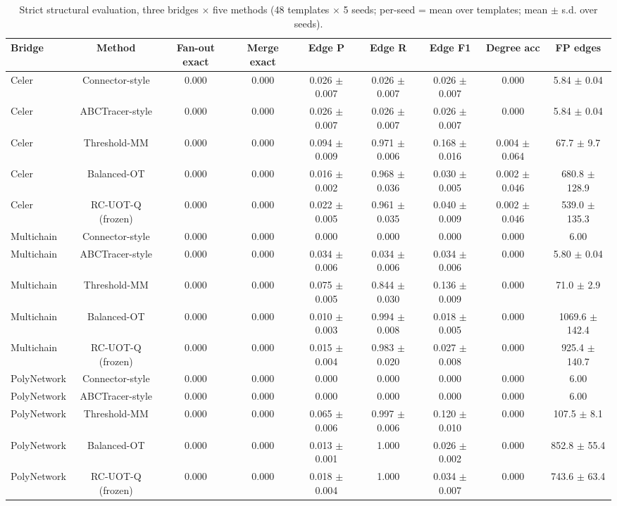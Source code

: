 \begin{table}[!t]
\caption{Strict structural evaluation, three bridges $\times$ five methods (48 templates $\times$ 5 seeds; per-seed = mean over templates; mean $\pm$ s.d. over seeds).}
\label{tab:strict}
\centering
\footnotesize
\setlength{\tabcolsep}{4pt}
\begin{tabular}{lcccccccc}
\toprule
Bridge & Method & Fan-out exact & Merge exact & Edge P & Edge R & Edge F1 & Degree acc & FP edges \\
\midrule
Celer & Connector-style & 0.000 & 0.000 & 0.026 $\pm$ 0.007 & 0.026 $\pm$ 0.007 & 0.026 $\pm$ 0.007 & 0.000 & 5.84 $\pm$ 0.04 \\
Celer & ABCTracer-style & 0.000 & 0.000 & 0.026 $\pm$ 0.007 & 0.026 $\pm$ 0.007 & 0.026 $\pm$ 0.007 & 0.000 & 5.84 $\pm$ 0.04 \\
Celer & Threshold-MM & 0.000 & 0.000 & 0.094 $\pm$ 0.009 & 0.971 $\pm$ 0.006 & 0.168 $\pm$ 0.016 & 0.004 $\pm$ 0.064 & 67.7 $\pm$ 9.7 \\
Celer & Balanced-OT & 0.000 & 0.000 & 0.016 $\pm$ 0.002 & 0.968 $\pm$ 0.036 & 0.030 $\pm$ 0.005 & 0.002 $\pm$ 0.046 & 680.8 $\pm$ 128.9 \\
Celer & RC-UOT-Q (frozen) & 0.000 & 0.000 & 0.022 $\pm$ 0.005 & 0.961 $\pm$ 0.035 & 0.040 $\pm$ 0.009 & 0.002 $\pm$ 0.046 & 539.0 $\pm$ 135.3 \\
Multichain & Connector-style & 0.000 & 0.000 & 0.000 & 0.000 & 0.000 & 0.000 & 6.00 \\
Multichain & ABCTracer-style & 0.000 & 0.000 & 0.034 $\pm$ 0.006 & 0.034 $\pm$ 0.006 & 0.034 $\pm$ 0.006 & 0.000 & 5.80 $\pm$ 0.04 \\
Multichain & Threshold-MM & 0.000 & 0.000 & 0.075 $\pm$ 0.005 & 0.844 $\pm$ 0.030 & 0.136 $\pm$ 0.009 & 0.000 & 71.0 $\pm$ 2.9 \\
Multichain & Balanced-OT & 0.000 & 0.000 & 0.010 $\pm$ 0.003 & 0.994 $\pm$ 0.008 & 0.018 $\pm$ 0.005 & 0.000 & 1069.6 $\pm$ 142.4 \\
Multichain & RC-UOT-Q (frozen) & 0.000 & 0.000 & 0.015 $\pm$ 0.004 & 0.983 $\pm$ 0.020 & 0.027 $\pm$ 0.008 & 0.000 & 925.4 $\pm$ 140.7 \\
PolyNetwork & Connector-style & 0.000 & 0.000 & 0.000 & 0.000 & 0.000 & 0.000 & 6.00 \\
PolyNetwork & ABCTracer-style & 0.000 & 0.000 & 0.000 & 0.000 & 0.000 & 0.000 & 6.00 \\
PolyNetwork & Threshold-MM & 0.000 & 0.000 & 0.065 $\pm$ 0.006 & 0.997 $\pm$ 0.006 & 0.120 $\pm$ 0.010 & 0.000 & 107.5 $\pm$ 8.1 \\
PolyNetwork & Balanced-OT & 0.000 & 0.000 & 0.013 $\pm$ 0.001 & 1.000 & 0.026 $\pm$ 0.002 & 0.000 & 852.8 $\pm$ 55.4 \\
PolyNetwork & RC-UOT-Q (frozen) & 0.000 & 0.000 & 0.018 $\pm$ 0.004 & 1.000 & 0.034 $\pm$ 0.007 & 0.000 & 743.6 $\pm$ 63.4 \\
\bottomrule
\end{tabular}
\end{table}


